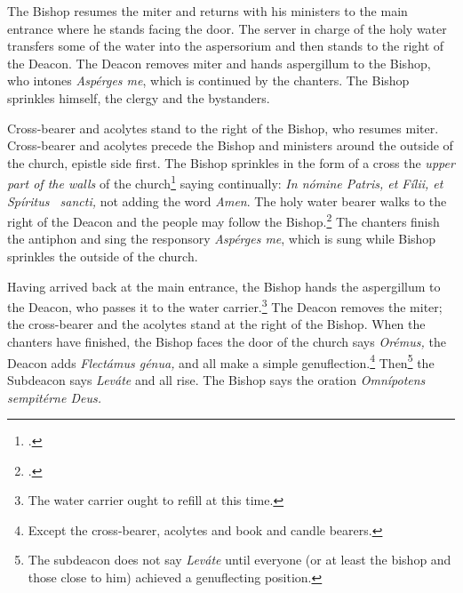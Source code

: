 \documentclass[letterpaper]{report}
\begin{document}
{    \rubric The Bishop resumes the miter and returns with his ministers to the main
    entrance where he stands facing the door. The server in charge of the holy
    water transfers some of the water into the aspersorium and then stands to
    the right of the Deacon. The Deacon removes miter and hands aspergillum to
    the Bishop, who intones \textit{Asp\'erges me}, which is continued by the
    chanters. The Bishop sprinkles himself, the clergy and the bystanders.

    \rubric Cross-bearer and acolytes stand to the right of the Bishop, who
    resumes miter. Cross-bearer and acolytes precede the Bishop and ministers
    around the outside of the church, epistle side first. The Bishop sprinkles
    in the form of a cross the \textit{upper part of the walls} of the
    church\footcite[The procession walks around and Bishop sprinkles the
    cemetery also if it be adjacent.][n. 41, p. 44.]{consecranda} saying
    continually: \textit{In nómine Pa\cross tris, et Fí\cross lii, et Spíritus
    \cross\ sancti,} not adding the word \textit{Amen}. The holy water bearer
    walks to the right of the Deacon and the people may follow the
    Bishop.\footcite[If it is impossible to go around the church, he sprinkles
    the wall at his right as far as he can, then, passing by the front of the
    church, he goes to the place at the other side of the church nearest the
    point at which he stoped on the right side and begins to sprinkle the walls
    from that point until he arrives at the main portal.][note 2, p.
    44.]{consecranda} The chanters finish the antiphon and sing the responsory
    \textit{Asp\'erges me}, which is sung while Bishop sprinkles the outside of the
    church.

    \rubric Having arrived back at the main entrance, the Bishop hands the
    aspergillum to the Deacon, who passes it to the water carrier.\footnote{The
    water carrier ought to refill at this time.} The Deacon removes the miter;
    the cross-bearer and the acolytes stand at the right of the Bishop. When
    the chanters have finished, the Bishop faces the door of the church says
    \textit{Orémus,} the Deacon adds \textit{Flectámus génua,} and all make a
    simple genuflection.\footnote{Except the cross-bearer, acolytes and book
    and candle bearers.} Then\footnote{The subdeacon does not say
    \textit{Leváte} until everyone (or at least the bishop and those close to
    him) achieved a genuflecting position.} the Subdeacon says \textit{Leváte}
    and all rise. The Bishop says the oration \textit{Omnípotens sempitérne
    Deus.}

}
\end{document}
